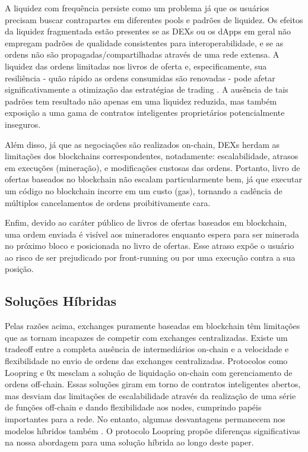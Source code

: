 \documentclass[UTF8,nofonts]{article}
\begin{document}
\begin{multicols}{2}
A liquidez com frequência persiste como um problema já que os usuários precisam buscar contrapartes em diferentes pools e padrões de liquidez. Os efeitos da liquidez fragmentada estão presentes se as DEXs ou os dApps em geral não empregam padrões de qualidade consistentes para interoperabilidade, e se as ordens não são propagadas/compartilhadas através de uma rede extensa. A liquidez das ordens limitadas nos livros de oferta e, especificamente, sua resiliência - quão rápido as ordens consumidas são renovadas - pode afetar significativamente a otimização das estratégias de trading \cite{limitorderliquidity}. A ausência de tais padrões tem resultado não apenas em uma liquidez reduzida, mas também exposição a uma gama de contratos inteligentes proprietários potencialmente inseguros.

Além disso, já que as negociações são realizados on-chain, DEXs herdam as limitações dos blockchains correspondentes, notadamente: escalabilidade, atrasos em execuções (mineração), e modificações custosas das ordens. Portanto, livro de ofertas baseados no blockchain não escalam particularmente bem, já que executar um código no blockchain incorre em um custo (gas), tornando a cadência de múltiplos cancelamentos de ordens proibitivamente cara.

Enfim, devido ao caráter público de livros de ofertas baseados em blockchain, uma ordem enviada é visível aos mineradores enquanto espera para ser minerada no próximo bloco e posicionada no livro de ofertas. Esse atraso expõe o usuário ao risco de ser prejudicado por front-running ou por uma execução contra a sua posição.

\subsection{Soluções Híbridas}
Pelas razões acima, exchanges puramente baseadas em blockchain têm limitações que as tornam incapazes de competir com exchanges centralizadas. Existe um tradeoff entre a completa ausência de intermediários on-chain e a velocidade e flexibilidade no envio de ordens das exchanges centralizadas. Protocolos como Loopring e 0x \cite{warren20170x} mesclam a solução de liquidação on-chain com gerenciamento de ordens off-chain. Essas soluções giram em torno de contratos inteligentes abertos, mas desviam das limitações de escalabilidade através da realização de uma série de funções off-chain e dando flexibilidade aos nodes, cumprindo papéis importantes para a rede. No entanto, algumas desvantagens permanecem nos modelos híbridos também \cite{costofdecent}. O protocolo Loopring propõe diferenças significativas na nossa abordagem para uma solução híbrida ao longo deste paper.


\end{multicols}
\end{document}
